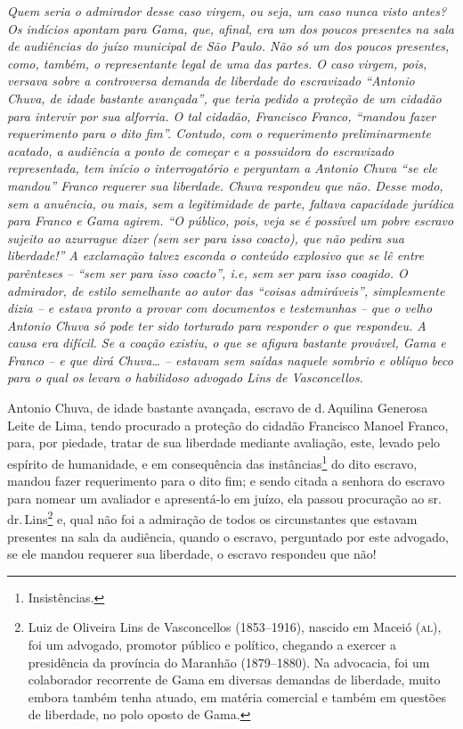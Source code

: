 \begin{didascalia}
\emph{Quem seria o admirador desse caso virgem, ou seja, um caso nunca
visto antes? Os indícios apontam para Gama, que, afinal, era um dos
poucos presentes na sala de audiências do juízo municipal de São Paulo.
Não só um dos poucos presentes, como, também, o representante legal de
uma das partes. O caso virgem, pois, versava sobre a controversa demanda
de liberdade do escravizado ``Antonio Chuva, de idade bastante avançada'',
que teria pedido a proteção de um cidadão para intervir por sua
alforria. O tal cidadão, Francisco Franco, ``mandou fazer requerimento
para o dito fim''. Contudo, com o requerimento preliminarmente acatado, a
audiência a ponto de começar e a possuidora do escravizado representada,
tem início o interrogatório e perguntam a Antonio Chuva ``se ele mandou''
Franco requerer sua liberdade. Chuva respondeu que não. Desse modo, sem
a anuência, ou mais, sem a legitimidade de parte, faltava capacidade
jurídica para Franco e Gama agirem. ``O público, pois, veja se é possível
um pobre escravo sujeito ao azurrague dizer (sem ser para isso coacto),
que não pedira sua liberdade!'' A exclamação talvez esconda o conteúdo
explosivo que se lê entre parênteses -- ``sem ser para isso coacto'', i.e,
sem ser para isso coagido. O admirador, de estilo semelhante ao autor
das ``coisas admiráveis'', simplesmente dizia -- e estava pronto a provar
com documentos e testemunhas -- que o velho Antonio Chuva só pode ter
sido torturado para responder o que respondeu. A causa era difícil. Se a
coação existiu, o que se afigura bastante provável, Gama e Franco -- e
que dirá Chuva\ldots{} -- estavam sem saídas naquele sombrio e oblíquo beco
para o qual os levara o habilidoso advogado Lins de Vasconcellos.}
\end{didascalia}

Antonio Chuva, de idade bastante avançada, escravo de d.\,Aquilina
Generosa Leite de Lima, tendo procurado a proteção do cidadão Francisco
Manoel Franco, para, por piedade, tratar de sua liberdade mediante
avaliação, este, levado pelo espírito de humanidade, e em consequência
das instâncias\footnote{ Insistências.} do dito escravo, mandou fazer
requerimento para o dito fim; e sendo citada a senhora do escravo para
nomear um avaliador e apresentá-lo em juízo, ela passou procuração ao
sr.\,dr.\,Lins\footnote{ Luiz de Oliveira Lins de Vasconcellos
  (1853--1916), nascido em Maceió (\textsc{al}), foi um advogado, promotor público
  e político, chegando a exercer a presidência da província do Maranhão
  (1879--1880). Na advocacia, foi um colaborador recorrente de Gama em
  diversas demandas de liberdade, muito embora também tenha atuado, em
  matéria comercial e também em questões de liberdade, no polo oposto de
  Gama.} e, qual não foi a admiração de todos os circunstantes que
estavam presentes na sala da audiência, quando o escravo, perguntado por
este advogado, se ele mandou requerer sua liberdade, o escravo respondeu
que não!

